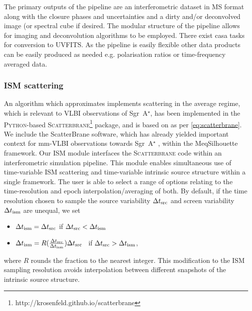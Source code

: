 The primary outputs of the pipeline are an interferometric dataset in MS format along with the closure phases and uncertainties and a dirty and/or deconvolved image (or spectral cube if desired. The modular structure of the pipeline allows for imaging and deconvolution algorithms to be employed. There exist {\sc casa} tasks for conversion to UVFITS. As the pipeline is easily flexible other data products can be easily produced as needed e.g. polarisation ratios or time-frequency averaged data.


\subsubsection{ISM scattering}

An algorithm which approximates implements scattering in the average regime, which is relevant to VLBI observations of Sgr~A$^\star$, has been implemented in the \textsc{Python}-based \textsc{Scatterbrane}\footnote{http://krosenfeld.github.io/scatterbrane} package, and is based on \citet*{Johnson_2015a} as per  \ref{eq:scatterbrane}.
We include the {\sc ScatterBrane} software, which has already yielded important context for mm-VLBI observations towards Sgr~A$^\star$ \citep[e.g.][]{2016arXiv160106571O}, within the {\sc MeqSilhouette} framework. Our ISM module interfaces the \textsc{Scatterbrane} code within an interferometric simulation pipeline. This module enables simultaneous use of time-variable ISM scattering and time-variable intrinsic source structure within a single framework. The user is able to select a range of options relating to the time-resolution and epoch interpolation/averaging of both. By default, if the time resolution chosen to sample the source variability $\Delta t_{\rm src}$ and screen variability $\Delta t_{\rm ism}$ are unequal, we set  
\begin{itemize}
 \setlength\itemsep{1em}
\item $\Delta t_{\rm ism}=\Delta t_{\rm src}$ \qquad \qquad if \qquad  $\Delta t_{\rm src} < \Delta t_{\rm ism}$
\item $\Delta t_{\rm ism}=R(\frac{\Delta t_{\rm src}}{\Delta t_{\rm ism}})\Delta t_{\rm src}$ \ if \qquad  $\Delta t_{\rm src} > \Delta t_{\rm ism}$,
\end{itemize}
where $R$ rounds the fraction to the nearest integer.  This modification to the ISM sampling resolution avoids interpolation between different snapshots of the intrinsic source structure.


